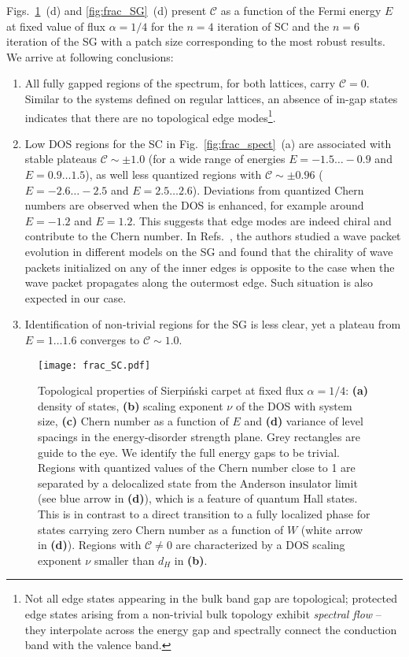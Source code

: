 Figs.~\ref{fig:frac_SC}~(d) and \ref{fig:frac_SG}~(d) present $\mathcal{C}$ as a function of the Fermi energy $E$ at fixed value of flux $ \alpha =1/4$ for the $n=4$ iteration of SC and the $n=6$ iteration of the SG with a patch size corresponding to the most robust results. We arrive at following conclusions:
\begin{enumerate}[label=\textbf{\arabic*.}]
\item All fully gapped regions of the spectrum, for both lattices, carry $\mathcal{C}=0$. Similar to the systems defined on regular lattices, an absence of in-gap states indicates that there are no topological edge modes\footnote{Not all edge states appearing in the bulk band gap are topological; protected edge states arising from a non-trivial bulk topology exhibit \emph{spectral flow} -- they interpolate across the energy gap and spectrally connect the conduction band with the valence band.}.

\item Low DOS regions for the SC in Fig.~\ref{fig:frac_spect}~(a) are associated with stable plateaus $\mathcal{C} \sim \pm 1.0$ (for a wide range of energies $E = -1.5 \ldots - 0.9$ and $E = 0.9 \ldots 1.5$), as well less quantized regions with $\mathcal{C} \sim \pm 0.96$ ($E = -2.6\ldots -2.5$ and $E = 2.5\ldots 2.6$). Deviations from quantized Chern numbers are observed when the DOS is enhanced, for example around $E = -1.2$ and $E = 1.2$. This suggests that edge modes are indeed chiral and contribute to the Chern number. In Refs.~\cite{2018:BHZ, PaiFractal2019}, the authors studied a wave packet evolution in different models on the SG and found that the chirality of wave packets initialized on any of the inner edges is opposite to the case when the wave packet propagates along the outermost edge. Such situation is also expected in our case.

\item Identification of non-trivial regions for the SG is less clear, yet a plateau from $E = 1\ldots 1.6$ converges to $\mathcal{C} \sim 1.0$. 
\end{enumerate}

\begin{figure}[H]
\centering
\texttt{[image: frac\_SC.pdf]} 
\caption[Topological properties of the Sierpiński carpet at fixed flux $\alpha = 1/4$]{Topological properties of Sierpiński carpet at fixed flux $\alpha = 1/4$: \textbf{(a)} density of states, \textbf{(b)} scaling exponent $\nu$ of the DOS with system size, \textbf{(c)} Chern number as a function of $E$ and \textbf{(d)} variance of level spacings in the energy-disorder strength plane. Grey rectangles are guide to the eye. We identify the full energy gaps to be trivial. Regions with quantized values of the Chern number close to 1 are separated by a delocalized state from the Anderson insulator limit (see blue arrow in \textbf{(d)}), which is a feature of quantum Hall states. This is in contrast to a direct transition to a fully localized phase for states carrying zero Chern number as a function of $W$ (white arrow in \textbf{(d)}). Regions with $\mathcal{C} \neq 0$ are characterized by a DOS scaling exponent $\nu$ smaller than $d_{H}$ in \textbf{(b)}.}
\label{fig:frac_SC}
\end{figure}

